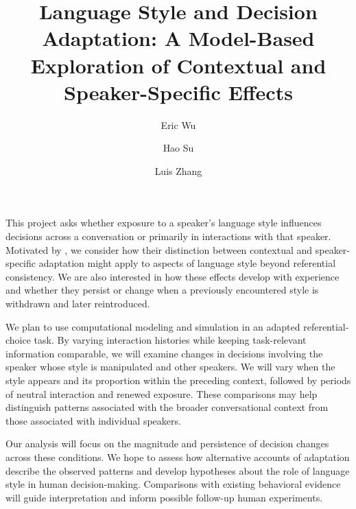 \documentclass[sigconf,nonacm]{acmart}
\begin{document}
\title{Language Style and Decision Adaptation: A Model-Based Exploration of Contextual and Speaker-Specific Effects}

\author{Eric Wu}
\author{Hao Su}
\author{Luis Zhang}

\maketitle

This project asks whether exposure to a speaker’s language style influences decisions across a conversation or primarily in interactions with that speaker. Motivated by \citet{kronmuller2026adapting}, we consider how their distinction between contextual and speaker-specific adaptation might apply to aspects of language style beyond referential consistency. We are also interested in how these effects develop with experience and whether they persist or change when a previously encountered style is withdrawn and later reintroduced.

We plan to use computational modeling and simulation in an adapted referential-choice task. By varying interaction histories while keeping task-relevant information comparable, we will examine changes in decisions involving the speaker whose style is manipulated and other speakers. We will vary when the style appears and its proportion within the preceding context, followed by periods of neutral interaction and renewed exposure. These comparisons may help distinguish patterns associated with the broader conversational context from those associated with individual speakers.

Our analysis will focus on the magnitude and persistence of decision changes across these conditions. We hope to assess how alternative accounts of adaptation describe the observed patterns and develop hypotheses about the role of language style in human decision-making. Comparisons with existing behavioral evidence will guide interpretation and inform possible follow-up human experiments.



\end{document}
